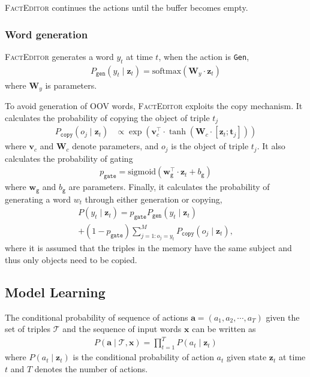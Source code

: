 \documentclass[11pt,a4paper]{article}
\begin{document}
\textsc{FactEditor} continues the actions until the buffer becomes empty.

\subsubsection*{Word generation}

\textsc{FactEditor} generates a word $y_t$ at time $t$, when the action is \texttt{Gen},
\begin{align*}
    P_{\texttt{gen}}({y}_t \mid \boldsymbol{z}_t) = \text{softmax}(\boldsymbol{W}_{y} \cdot \boldsymbol{z}_t)
\end{align*}
where $\boldsymbol{W}_{y}$ is parameters.

To avoid generation of OOV words, \textsc{FactEditor} exploits the copy mechanism. It calculates the probability of copying the object of triple $t_j$
\begin{align*}
    P_{\texttt{copy}}(o_j \mid \boldsymbol{z}_t) &\propto \exp{(\boldsymbol{v}_{c}^\top \cdot \tanh(\boldsymbol{W}_{c} \cdot [\boldsymbol{z}_t;\boldsymbol{t}_j] ))}
\end{align*}
where $\boldsymbol{v}_{c}$ and $\boldsymbol{W}_{c}$ denote parameters, and $o_j$ is the object of triple $t_j$. It also calculates the probability of gating
\begin{align*}
    p_{\texttt{gate}} = \text{sigmoid}(\boldsymbol{w}_{\texttt{g}}^\top \cdot \boldsymbol{z}_t + b_{\texttt{g}})
\end{align*}
where $\boldsymbol{w}_{\texttt{g}}$ and $b_\texttt{g}$ are parameters. Finally, it calculates the probability of generating a word $w_t$ through either generation or copying,
\begin{multline*}
    P(y_t \mid \boldsymbol{z}_t) = p_{\texttt{gate}} P_{\texttt{gen}}(y_t \mid \boldsymbol{z}_t) \\+ (1 - p_{\texttt{gate}}) \sum_{j=1: o_j = y_t}^{M} P_{\texttt{copy}}(o_j \mid \boldsymbol{z}_t),
\end{multline*}
where it is assumed that the triples in the memory have the same subject and thus only objects need to be copied.

\subsection{Model Learning}

The conditional probability of sequence of actions $\boldsymbol{a} = (a_1, a_2, \cdots, a_T)$ given the set of triples $\mathcal{T}$ and the sequence of input words $\boldsymbol{x}$ can be written as
\begin{align*}
    P(\boldsymbol{a} \mid \mathcal{T}, \boldsymbol{x}) = \prod_{t=1}^{T} P(a_t \mid \boldsymbol{z}_t)
\end{align*}
where $P(a_t \mid \boldsymbol{z}_t)$ is the conditional probability of action $a_t$ given state $\boldsymbol{z}_t$ at time $t$ and $T$ denotes the number of actions.
\end{document}
